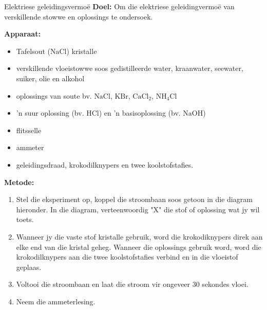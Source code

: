             \begin{g_experiment}{Elektriese geleidingsvermo\"{e}}
            \nopagebreak
            \label{m38720*id339425}\noindent{}\textbf{Doel:}
          \newline
Om die elektriese geleidingvermo\"{e} van verskillende stowwe en oplossings te ondersoek.\par 
        \label{m38720*id339438}\noindent{}\textbf{Apparaat:}
\begin{itemize}[noitemsep]
\item Tafelsout ($\text{NaCl}$) kristalle
\item verskillende vloeistowwe soos gedistilleerde water, kraanwater, seewater, suiker, olie en alkohol
\item oplossings van soute bv. $\text{NaCl}$, $\text{KBr}$, $\text{CaCl}_{2}$, $\text{NH}_{4}\text{Cl}$
\item 'n suur oplossing (bv. $\text{HCl}$) en 'n basisoplossing (bv. $\text{NaOH}$)
\item flitsselle
\item ammeter
\item geleidingsdraad, krokodilknypers en twee koolstofstafies.
\end{itemize}
        \label{m38720*eip-456}
	\par
      \label{m38720*id334346}\noindent{}\textbf{Metode:}
\begin{enumerate}[noitemsep, label=\textbf{\arabic*}.]
\item Stel die eksperiment op, koppel die stroombaan soos getoon in die diagram hieronder. In die diagram, verteenwoordig "X" die stof of oplossing wat jy wil toets.
\item Wanneer jy die vaste stof kristalle gebruik, word die krokodiknypers direk aan elke end van die kristal geheg.  Wanneer die oplossings gebruik word, word die krokodilknypers aan die twee koolstofstafies verbind en in die vloeistof geplaas. 
\item Voltooi die stroombaan en laat die stroom vir ongeveer 30 sekondes vloei. 
\item Neem die ammeterlesing.
\end{enumerate}
        \label{m38720*id334362}
\begin{minipage}{.5\textwidth}
    \setcounter{subfigure}{0}
	\begin{figure}[H] %
\begin{center}
\scalebox{0.7}{
\begin{pspicture}(0,-0.6)(5,6.2)

\end{pspicture}}
\end{center}
\end{figure}
\end{minipage}
\end{g_experiment}
